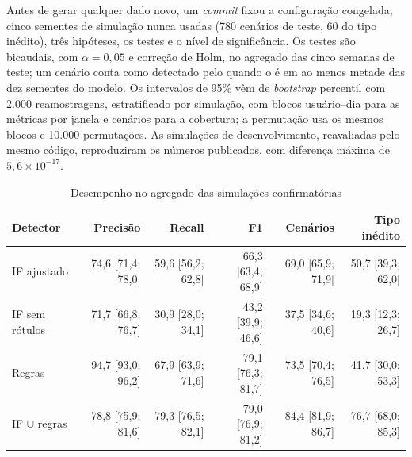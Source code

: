 Antes de gerar qualquer dado novo, um \textit{commit} fixou a configuração congelada, cinco
sementes de simulação nunca usadas (780 cenários de teste, 60 do tipo inédito), três hipóteses,
os testes e o nível de significância. Os testes são bicaudais, com $\alpha = 0{,}05$ e correção
de Holm, no agregado das cinco semanas de teste; um cenário conta como detectado pelo \iforest{}
quando o é em ao menos metade das dez sementes do modelo. Os intervalos de 95\% vêm de
\textit{bootstrap} percentil com 2.000 reamostragens, estratificado por simulação, com blocos
usuário--dia para as métricas por janela e cenários para a cobertura; a permutação usa os mesmos
blocos e 10.000 permutações. As simulações de desenvolvimento, reavaliadas pelo mesmo código,
reproduziram os números publicados, com diferença máxima de $5{,}6 \times 10^{-17}$.

\begin{table}[htb]
    \centering
    \ABNTEXfontereduzida
    \setlength{\tabcolsep}{3pt}
    \begin{minipage}{\textwidth}
        \caption{\label{tab:confirmatorio}Desempenho no agregado das simulações confirmatórias}
        \begin{tabular*}{\textwidth}{@{\extracolsep{\fill}}lrrrrr}
            \toprule
            \textbf{Detector} & \textbf{Precisão} & \textbf{Recall} & \textbf{F1} &
            \textbf{Cenários} & \textbf{Tipo inédito} \\
            \midrule
            IF ajustado      & 74,6 [71,4; 78,0] & 59,6 [56,2; 62,8] & 66,3 [63,4; 68,9] & 69,0 [65,9; 71,9] & 50,7 [39,3; 62,0] \\
            IF sem rótulos   & 71,7 [66,8; 76,7] & 30,9 [28,0; 34,1] & 43,2 [39,9; 46,6] & 37,5 [34,6; 40,6] & 19,3 [12,3; 26,7] \\
            Regras           & 94,7 [93,0; 96,2] & 67,9 [63,9; 71,6] & 79,1 [76,3; 81,7] & 73,5 [70,4; 76,5] & 41,7 [30,0; 53,3] \\
            IF $\cup$ regras & 78,8 [75,9; 81,6] & 79,3 [76,5; 82,1] & 79,0 [76,9; 81,2] & 84,4 [81,9; 86,7] & 76,7 [68,0; 85,3] \\
            \bottomrule
        \end{tabular*}
    \end{minipage}
\end{table}

